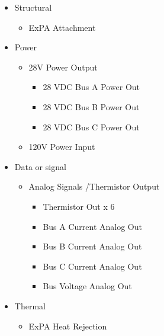 \begin{itemize}
\item{} Structural

\begin{itemize}
\item{} \gls{ExPA} Attachment

\end{itemize}

\item{} Power

\begin{itemize}
\item{} 28V Power Output

\begin{itemize}
\item{} 28 \gls{VDC} Bus A Power Out

\item{} 28 \gls{VDC} Bus B Power Out

\item{} 28 \gls{VDC} Bus C Power Out

\end{itemize}

\item{} 120V Power Input

\end{itemize}

\item{} Data or signal

\begin{itemize}
\item{} Analog Signals \slash  Thermistor Output

\begin{itemize}
\item{} Thermistor Out x 6

\item{} Bus A Current Analog Out

\item{} Bus B Current Analog Out

\item{} Bus C Current Analog Out

\item{} Bus Voltage Analog Out

\end{itemize}

\end{itemize}

\item{} Thermal

\begin{itemize}
\item{} \gls{ExPA} Heat Rejection


\end{itemize}
\end{itemize}
